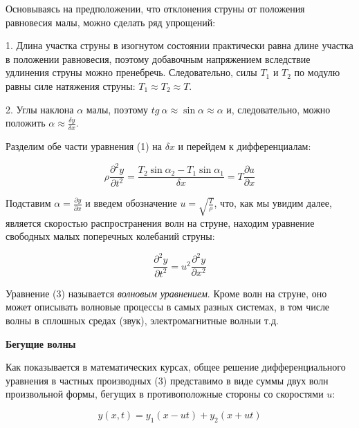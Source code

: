 \documentclass[14pt]{article}
\begin{document}
Основываясь на предположении, что отклонения струны от положения равновесия малы, можно сделать ряд упрощений:

1. Длина участка струны в изогнутом состоянии практически равна длине участка в положении равновесия, поэтому добавочным напряжением вследствие удлинения струны можно пренебречь. Следовательно, силы $T_1$ и $T_2$ по модулю равны силе натяжения струны: $T_1 \approx T_2 \approx T$.

2. Углы наклона $\alpha$ малы, поэтому $tg~\alpha \approx \sin\alpha \approx \alpha$ и, следовательно, можно положить $\alpha \approx \frac{\delta y}{\delta x}$.

Разделим обе части уравнения (1) на $\delta x$ и перейдем к дифференциалам:

\begin{center}
\begin{equation}
\rho \frac{\partial^2 y}{\partial t^2} = \frac{T_2\sin\alpha_2 - T_1\sin\alpha_1}{\delta x} = T\frac{\partial a}{\partial x}
\end{equation}
\end{center}

Подставим $\alpha = \frac{\partial y}{\partial x}$ и введем обозначение $u = \sqrt{\frac{T}{\rho}}$, что, как мы увидим далее, является скоростью распространения волн на струне, находим уравнение свободных малых поперечных колебаний струны:


\begin{center}
\begin{equation}
\boxed{\frac{\partial^2 y}{\partial t^2} = u^2 \frac{\partial^2 y}{\partial x^2}}
\end{equation}
\end{center}

Уравнение (3) называется \textsl{волновым уравнением}. Кроме волн на струне, оно может описывать волновые процессы в самых разных системах, в том числе волны в сплошных средах (звук), электромагнитные волныи т.д. 

\vspace{1cm}
\textbf{Бегущие волны}

Как показывается в математических курсах, общее решение дифференциального уравнения в частных производных (3) представимо в виде суммы двух волн произвольной формы, бегущих в противоположные стороны со скоростями $u$:

\begin{center}
\begin{equation}
y(x, t) = y_1(x - ut) + y_2(x + ut)
\end{equation}
\end{center}
\end{document}

